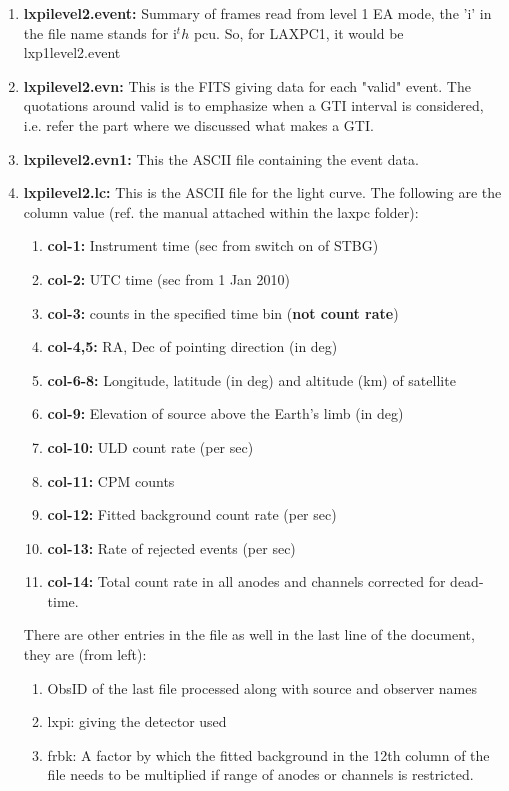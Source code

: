 \documentclass[a4paper,twoside]{report}
\numberwithin{equation}{section}
\begin{document}
\begin{enumerate}
\item \textbf{lxpilevel2.event:} Summary of frames read from level 1 EA mode, the 'i' in the file name stands for i$^th$ pcu. So, for LAXPC1, it would be lxp1level2.event
\item \textbf{lxpilevel2.evn:} This is the FITS giving data for each "valid" event. The quotations around valid is to emphasize when a GTI interval is considered, i.e. refer the part where we discussed what makes a GTI.
\item \textbf{lxpilevel2.evn1:} This the ASCII file containing the event data.
\item {\textbf{lxpilevel2.lc:} This is the ASCII file for the light curve. The following are the column value (ref. the manual attached within the laxpc folder):
\begin{enumerate}
\item \textbf{col-1:} Instrument time (sec from switch on of STBG)
\item \textbf{col-2:} UTC time (sec from 1 Jan 2010)
\item \textbf{col-3:} counts in the specified time bin (\textbf{not count rate})
\item \textbf{col-4,5:} RA, Dec of pointing direction (in deg)
\item \textbf{col-6-8:} Longitude, latitude (in deg) and altitude (km) of satellite
\item \textbf{col-9:} Elevation of source above the Earth's limb (in deg)
\item \textbf{col-10:} ULD count rate (per sec)
\item \textbf{col-11:} CPM counts
\item \textbf{col-12:} Fitted background count rate (per sec)
\item \textbf{col-13:} Rate of rejected events (per sec)
\item \textbf{col-14:} Total count rate in all anodes and channels corrected for dead-time.
\end{enumerate}
There are other entries in the file as well in the last line of the document, they are (from left):
\begin{enumerate}
\item ObsID of the last file processed along with source and observer names
\item lxpi: giving the detector used
\item frbk: A factor by which the fitted background in the 12th column of the file needs to be multiplied if range of anodes or channels is restricted.

\end{enumerate}}
\end{enumerate}
\end{document}
